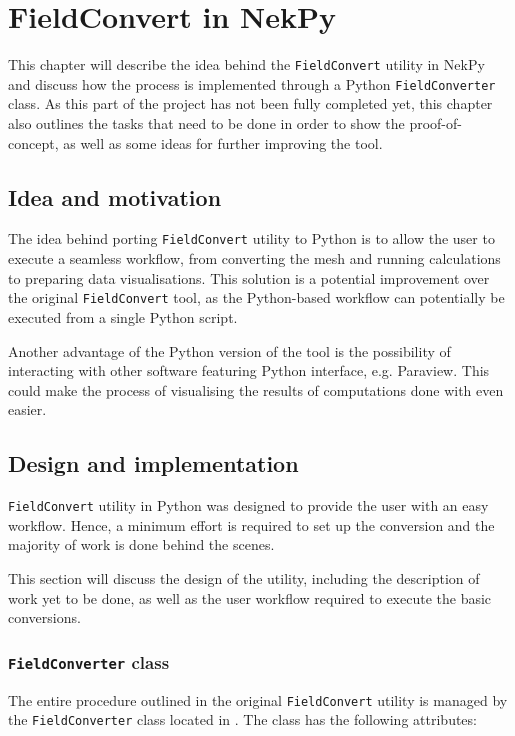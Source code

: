 \chapter{FieldConvert in NekPy}

This chapter will describe the idea behind the \texttt{FieldConvert} utility in 
NekPy and discuss how the process is implemented through a Python 
\texttt{FieldConverter} class. As this part of the project has not been fully 
completed yet, this chapter also outlines the tasks that need to be done in order 
to show the proof-of-concept, as well as some ideas for further improving the tool.

\section{Idea and motivation}

The idea behind porting \texttt{FieldConvert} utility to Python is to allow the 
user to execute a seamless workflow, from converting the mesh and running 
calculations to preparing data visualisations. This solution is a potential 
improvement over the original \texttt{FieldConvert} tool, as the Python-based 
workflow can potentially be executed from a single Python script.

Another advantage of the Python version of the tool is the possibility of 
interacting with other software featuring Python interface, e.g. Paraview. 
This could make the process of visualising the results of computations done 
with \nek{} even easier.

\section{Design and implementation}

\texttt{FieldConvert} utility in Python was designed to provide the user with 
an easy workflow. Hence, a minimum effort is required to set up the conversion 
and the majority of work is done behind the scenes.

This section will discuss the design of the utility, including the description 
of work yet to be done, as well as the user workflow required to execute the 
basic conversions.

\subsection{\texttt{FieldConverter} class}

The entire procedure outlined in the original \texttt{FieldConvert} utility is 
managed by the \texttt{FieldConverter} class located in 
. The class has the following 
attributes:

